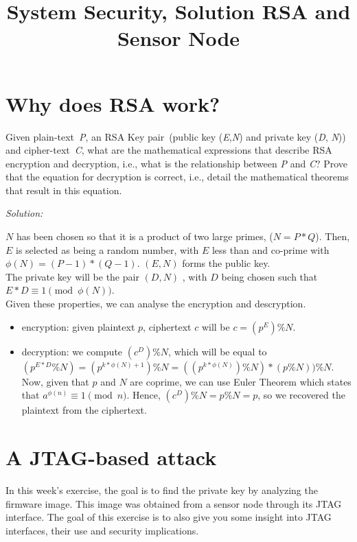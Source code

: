 \documentclass[a4paper,11pt]{article}
\title{System Security,
\ifsolution Solution \else \fi
RSA and Sensor Node}
\newenvironment{solution}%
{\par{\noindent\small\textit{Solution:}}\vspace{-12pt}\begin{framed}}%
{\end{framed}\par}
\begin{document}
\maketitle

\section{Why does RSA work?}
Given plain-text~\emph{P}, an RSA Key pair~(public key (\emph{E},\emph{N}) and
private key (\emph{D}, \emph{N})) and cipher-text~\emph{C}, what are the
mathematical expressions that describe RSA encryption and decryption, i.e.,
what is the relationship between \emph{P} and \emph{C}? Prove that the
equation for decryption is correct, i.e., detail the mathematical theorems
that result in this equation.
\ifsolution\begin{solution}
$N$ has been chosen so that it is a product of two large primes, ($N = P * Q$).
Then, $E$ is selected as being a random number, with $E$ less than and co-prime with
$\phi(N) = (P - 1) * (Q - 1)$. $(E, N)$ forms the public key.\\
The private key will be the pair $(D, N)$ , with $D$ being chosen such that
$E * D \equiv 1 \pmod{\phi(N)}$.\\
Given these properties, we can analyse the encryption and descryption.
\begin{itemize}
  \item encryption: given plaintext $p$, ciphertext $c$ will be $c = (p^E) \% N$.
  \item decryption: we compute $(c^D) \% N$, which will be equal to $(p^{E * D} \% N) =
  (p^{k * \phi(N) + 1}) \% N = ((p^{k * \phi(N)}) \% N) * (p \% N)) \% N$. Now, given
  that $p$ and $N$ are coprime, we can use Euler Theorem \cite{eulerth} which states
  that $a^{\phi(n)} \equiv 1 \pmod{n}$. Hence, $(c^D) \% N = p \% N = p$, so we recovered
  the plaintext from the ciphertext.
\end{itemize}

\end{solution}\fi

\section{A JTAG-based attack}
In this week's exercise, the goal is to find the private key by analyzing the
firmware image. This image was obtained from a sensor node through its JTAG
interface. The goal of this exercise is to also give you some insight into JTAG
interfaces, their use and security implications.
\end{document}
